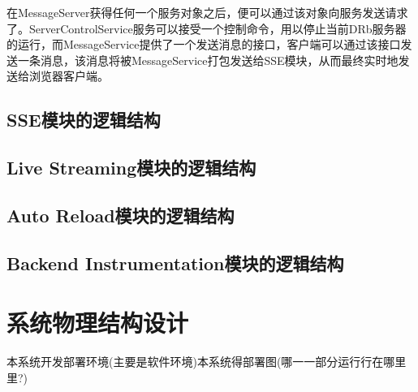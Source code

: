 在MessageServer获得任何一个服务对象之后，便可以通过该对象向服务发送请求了。ServerControlService服务可以接受一个控制命令，用以停止当前DRb服务器的运行，而MessageService提供了一个发送消息的接口，客户端可以通过该接口发送一条消息，该消息将被MessageService打包发送给SSE模块，从而最终实时地发送给浏览器客户端。

\subsection{SSE模块的逻辑结构}

\subsection{Live Streaming模块的逻辑结构}

\subsection{Auto Reload模块的逻辑结构}

\subsection{Backend Instrumentation模块的逻辑结构}

\section{系统物理结构设计}
本系统开发部署环境(主要是软件环境)本系统得部署图(哪⼀一部分运⾏行在哪⾥里?)













